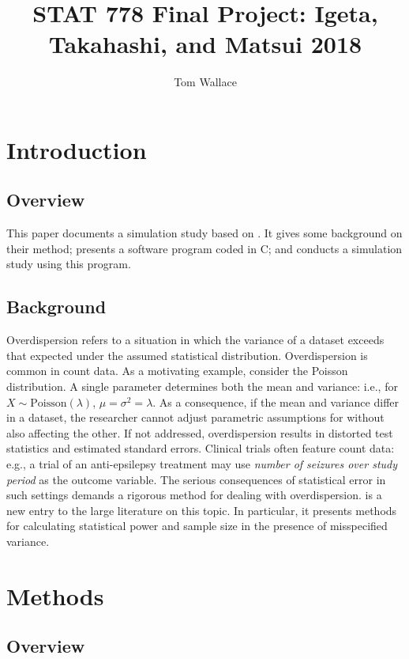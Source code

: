 \documentclass{article}
\author{Tom Wallace}
\title{STAT 778 Final Project: Igeta, Takahashi, and Matsui
2018}
\begin{document}
\maketitle

\section{Introduction}

\subsection{Overview}

This paper documents a simulation study based on \cite{igeta2018}. It
gives some background on their method; presents a software program coded in C; 
and conducts a simulation study using this program. 

\subsection{Background}

Overdispersion refers to a situation in which the variance of a dataset exceeds
that expected under the assumed statistical distribution. 
Overdispersion is common in count data. As a motivating example, consider the
Poisson distribution. A single parameter determines both the 
mean and variance: i.e., for $X \sim \mathrm{Poisson}(\lambda)$, $\mu =
\sigma^2 = \lambda$. As a consequence, if the mean and variance
differ in a dataset, the researcher cannot adjust parametric assumptions for 
without also affecting the other. If not addressed, 
overdispersion results in distorted test statistics and estimated
standard errors. Clinical trials often feature count data: e.g., a trial of an
anti-epsilepsy treatment may use \textit{number of seizures over study period} as the outcome
variable. The serious consequences of statistical error in such settings demands
a rigorous method for dealing with overdispersion. \cite{igeta2018} is a new
entry to the large literature on this topic. In particular, it presents methods
for calculating statistical power and sample size in the presence of
misspecified variance.

\section{Methods}

\subsection{Overview}
\end{document}
